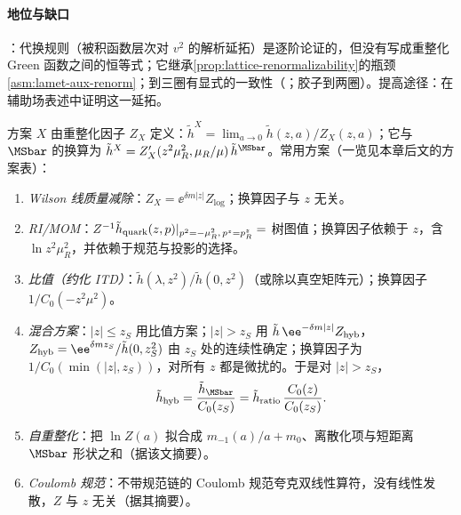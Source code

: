 \paragraph{地位与缺口}
\tagA：代换规则（被积函数层次对 $v^2$ 的解析延拓）是逐阶论证的，但没有写成重整化 Green 函数之间的恒等式；它继承\cref{prop:lattice-renormalizability}的瓶颈\cref{asm:lamet-aux-renorm}；到三圈有显式的一致性（\cite[附录~A]{Braun:2020ymy}；胶子到两圈）。提高途径：在辅助场表述中证明这一延拓。

\begin{definition}[准关联函数的重整化方案]\label{def:lamet-schemes}
方案 $X$ 由重整化因子 $Z_X$ 定义：$\tilde h^X=\lim_{a\to0}\tilde h(z,a)/Z_X(z,a)$；它与 $\MSbar$ 的换算为 $\tilde h^X=Z'_X(z^2\mu_R^2,\mu_R/\mu)\,\tilde h^{\MSbar}$\cite{IzubuchiEtAl2018}。常用方案（一览见本章后文的方案表）：
\begin{enumerate}[label=(\roman*),leftmargin=2em,itemsep=1pt,topsep=2pt]
\item \emph{Wilson 线质量减除}：$Z_X=\ee^{\delta m|z|}Z_{\log}$；换算因子与 $z$ 无关\cite{Chen:2016fxx,Ishikawa:2016znu,Green:2017xeu}。
\item \emph{RI/MOM}：$Z^{-1}\tilde h_{\rm quark}(z,p)|_{p^2=-\mu_R^2,\,p^z=p^z_R}=$ 树图值；换算因子依赖于 $z$，含 $\ln z^2\mu_R^2$，并依赖于规范与投影的选择\cite{Constantinou:2017sej,Stewart:2017tvs,Alexandrou:2017huk,Chen:2017mzz,LatticeParton:2018gjr}。
\item \emph{比值（约化 ITD）}：$\tilde h(\lambda,z^2)/\tilde h(0,z^2)$（或除以真空矩阵元）；换算因子 $1/C_0(-z^2\mu^2)$\cite{Radyushkin2017,Orginos:2017kos,Braun:2018brg}。
\item \emph{混合方案}：$|z|\le z_S$ 用比值方案；$|z|>z_S$ 用 $\tilde h\,\ee^{-\delta m|z|}Z_{\rm hyb}$，$Z_{\rm hyb}=\ee^{\delta mz_S}/\tilde h(0,z_S^2)$ 由 $z_S$ 处的连续性确定；换算因子为 $1/C_0(\min(|z|,z_S))$，对所有 $z$ 都是微扰的\cite{Ji:2020brr}。于是对 $|z|>z_S$，
\begin{equation}\label{eq:lamet-hybrid-conv}
\tilde h_{\rm hyb}=\frac{\tilde h_{\MSbar}}{C_0(z_S)}=\tilde h_{\rm ratio}\,\frac{C_0(z)}{C_0(z_S)} .
\end{equation}%
\item \emph{自重整化}：把 $\ln Z(a)$ 拟合成 $m_{-1}(a)/a+m_0$、离散化项与短距离 $\MSbar$ 形状之和\cite{LatticePartonLPC:2021gpi}（据该文摘要）。
\item \emph{Coulomb 规范}：不带规范链的 Coulomb 规范夸克双线性算符，没有线性发散，$Z$ 与 $z$ 无关\cite{Gao:2023lny,Zhao:2023ptv}（据其摘要）。
\end{enumerate}
\end{definition}

